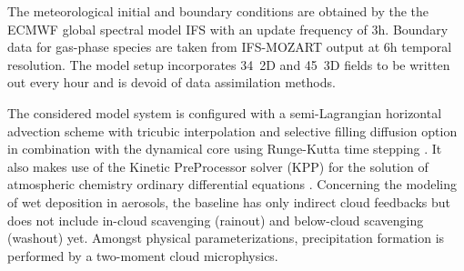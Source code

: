The meteorological initial and boundary conditions are obtained by the
the ECMWF  global spectral model IFS  with an update  frequency of 3h.
Boundary data  for gas-phase species are taken  from IFS-MOZART output
at  6h temporal resolution.   The model  setup incorporates  34~2D and
45~3D  fields to  be written  out  every hour  and is  devoid of  data
assimilation methods.

The   considered  \cosmoart   model  system   is  configured   with  a
semi-Lagrangian   horizontal    advection   sche\-me   with   tricubic
interpolation  and selective filling  diffusion option  in combination
with   the   dynamical    core   using   Runge-Kutta   time   stepping
\cite{COSMO-PartI-2011}.    It   also  makes   use   of  the   Kinetic
PreProcessor solver  (KPP) for  the solution of  atmospheric chemistry
ordinary  differential equations  \cite{Damian-2002}.   Concerning the
modeling  of  wet  deposition  in  aerosols, the  baseline  has  only
indirect  cloud feedbacks  but  does not  include in-cloud  scavenging
(rainout) and below-cloud  scavenging (washout) yet.  Amongst physical
parameterizations,   precipitation  formation   is   performed  by   a
two-moment cloud microphysics.
